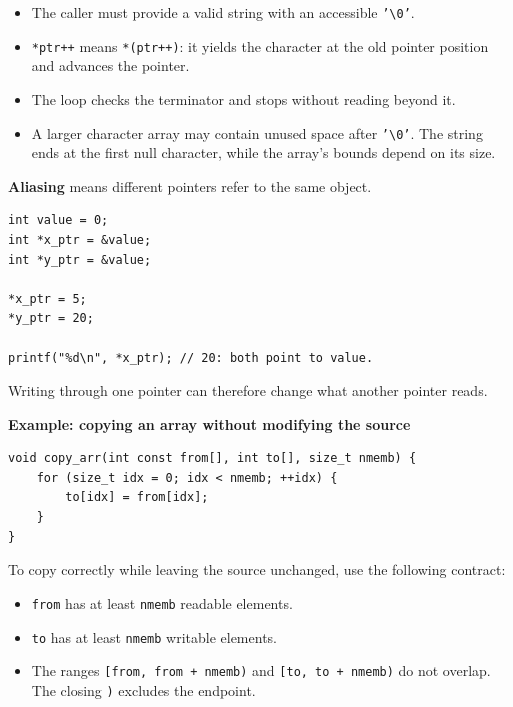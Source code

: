\documentclass[11pt,a4paper]{article}
\begin{document}
\begin{itemize}
    \item The caller must provide a valid string with an
          accessible \texttt{'\textbackslash0'}.
    \item \texttt{*ptr++} means \texttt{*(ptr++)}: it yields the
          character at the old pointer position and advances
          the pointer.
    \item The loop checks the terminator and stops without
          reading beyond it.
    \item A larger character array may contain unused space
          after \texttt{'\textbackslash0'}. The string ends at
          the first null character, while the array's bounds
          depend on its size.
\end{itemize}


\textbf{Aliasing} means different pointers refer to the same object.

\begin{lstlisting}[style=cscode]
int value = 0;
int *x_ptr = &value;
int *y_ptr = &value;

*x_ptr = 5;
*y_ptr = 20;

printf("%d\n", *x_ptr); // 20: both point to value.
\end{lstlisting}

Writing through one pointer can therefore change what another
pointer reads.

\textbf{Example: copying an array without modifying the source}

\begin{lstlisting}[style=cscode]
void copy_arr(int const from[], int to[], size_t nmemb) {
    for (size_t idx = 0; idx < nmemb; ++idx) {
        to[idx] = from[idx];
    }
}
\end{lstlisting}

To copy correctly while leaving the source unchanged, use the
following contract:

\begin{itemize}
    \item \texttt{from} has at least \texttt{nmemb} readable elements.
    \item \texttt{to} has at least \texttt{nmemb} writable elements.
    \item The ranges
          \texttt{[from, from + nmemb)} and
          \texttt{[to, to + nmemb)} do not overlap.
          The closing \texttt{)} excludes the endpoint.
\end{itemize}
\end{document}
